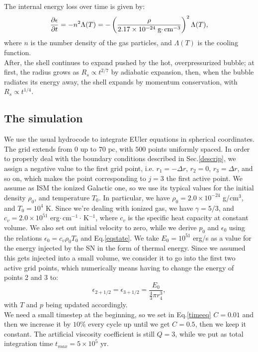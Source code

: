 \documentclass{article}
\begin{document}
The internal energy loss over time is given by:
\begin{equation}\label{dedt}
	\pdv{\epsilon}{t}= -n^2\Lambda(T)=-\left(\frac{\rho}{2.17\times 10^{-24}\;\text{g$\cdot\,$cm}^{-3}}\right)^2\Lambda(T),
\end{equation}
where $n$ is the number density of the gas particles, and $\Lambda(T)$ is the cooling function. \\
After, the shell continues to expand pushed by the hot, overpressurized bubble; at first, the radius grows as $R_s\propto t^{2/7}$ by adiabatic expansion, then, when the bubble radiates its energy away, the shell expands by momentum conservation, with $R_s\propto t^{1/4}$.

\subsection{The simulation}
We use the usual hydrocode to integrate EUler equations in spherical coordinates. The grid extends from $0$ up to $70$ pc, with $500$ points uniformly spaced. In order to properly deal with the boundary conditions described in Sec.\ref{descrip}, we assign a negative value to the first grid point, i.e. $r_1=-\Delta r$, $r_2=0$, $r_3=\Delta r$, and so on, which makes the point corresponding to $j=3$ the first active point. 
We assume as ISM the ionized Galactic one, so we use its typical values for the initial density $\rho_0$, and temperature $T_0$. In particular, we have $\rho_0=2.0\times 10^{-24}$ g/cm$^{3}$, and $T_0=10^4$ K. Since we're dealing with ionized gas, we have $\gamma =5/3$, and $c_v=2.0\times 10^{51}$ erg$\cdot\,$cm$^{-1}\cdot\,$K$^{-1}$, where $c_v$ is the specific heat capacity at constant volume. We also set out initial velocity to zero, while we derive $p_0$ and $\epsilon_0$ using the relations $\epsilon_0=c_v\rho_0T_0$ and Eq.\eqref{eqstate}. We take $E_0=10^{51}$ erg/s as a value for the energy injected by the SN in the form of thermal energy. Since we assumed this gets injected into a small volume, we consider it to go into the first two active grid points, which numerically means having to change the energy of points 2 and 3 to:
\begin{equation}
	\epsilon_{2+1/2}=\epsilon_{3+1/2}=\frac{E_0}{\frac{4}{3}\pi r_4^3},
\end{equation}
with $T$ and $p$ being updated accordingly.\\
We need a small timestep at the beginning, so we set in Eq.\eqref{timeeq} $C=0.01$ and then we increase it by $10\%$ every cycle up until we get $C=0.5$, then we keep it constant. The artificial viscosity coefficient is still $Q=3$, while we put as total integration time $t_{max}=5\times 10^5$ yr. 
\end{document}
